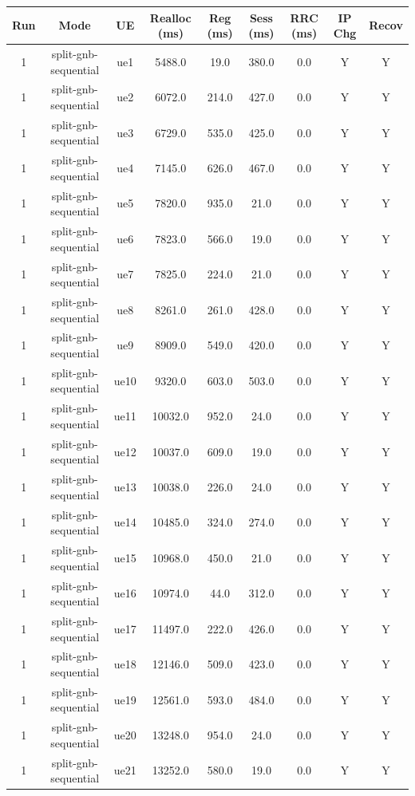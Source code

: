 \begin{table}[ht]
\centering
\begin{tabular}{|c|c|c|c|c|c|c|c|c|}
\hline
Run & Mode & UE & Realloc (ms) & Reg (ms) & Sess (ms) & RRC (ms) & IP Chg & Recov \\
\hline
1 & split-gnb-sequential & ue1 & 5488.0 & 19.0 & 380.0 & 0.0 & Y & Y \\
1 & split-gnb-sequential & ue2 & 6072.0 & 214.0 & 427.0 & 0.0 & Y & Y \\
1 & split-gnb-sequential & ue3 & 6729.0 & 535.0 & 425.0 & 0.0 & Y & Y \\
1 & split-gnb-sequential & ue4 & 7145.0 & 626.0 & 467.0 & 0.0 & Y & Y \\
1 & split-gnb-sequential & ue5 & 7820.0 & 935.0 & 21.0 & 0.0 & Y & Y \\
1 & split-gnb-sequential & ue6 & 7823.0 & 566.0 & 19.0 & 0.0 & Y & Y \\
1 & split-gnb-sequential & ue7 & 7825.0 & 224.0 & 21.0 & 0.0 & Y & Y \\
1 & split-gnb-sequential & ue8 & 8261.0 & 261.0 & 428.0 & 0.0 & Y & Y \\
1 & split-gnb-sequential & ue9 & 8909.0 & 549.0 & 420.0 & 0.0 & Y & Y \\
1 & split-gnb-sequential & ue10 & 9320.0 & 603.0 & 503.0 & 0.0 & Y & Y \\
1 & split-gnb-sequential & ue11 & 10032.0 & 952.0 & 24.0 & 0.0 & Y & Y \\
1 & split-gnb-sequential & ue12 & 10037.0 & 609.0 & 19.0 & 0.0 & Y & Y \\
1 & split-gnb-sequential & ue13 & 10038.0 & 226.0 & 24.0 & 0.0 & Y & Y \\
1 & split-gnb-sequential & ue14 & 10485.0 & 324.0 & 274.0 & 0.0 & Y & Y \\
1 & split-gnb-sequential & ue15 & 10968.0 & 450.0 & 21.0 & 0.0 & Y & Y \\
1 & split-gnb-sequential & ue16 & 10974.0 & 44.0 & 312.0 & 0.0 & Y & Y \\
1 & split-gnb-sequential & ue17 & 11497.0 & 222.0 & 426.0 & 0.0 & Y & Y \\
1 & split-gnb-sequential & ue18 & 12146.0 & 509.0 & 423.0 & 0.0 & Y & Y \\
1 & split-gnb-sequential & ue19 & 12561.0 & 593.0 & 484.0 & 0.0 & Y & Y \\
1 & split-gnb-sequential & ue20 & 13248.0 & 954.0 & 24.0 & 0.0 & Y & Y \\
1 & split-gnb-sequential & ue21 & 13252.0 & 580.0 & 19.0 & 0.0 & Y & Y \\

\end{tabular}
\end{table}
